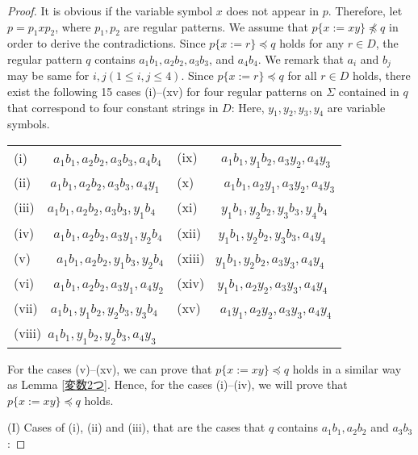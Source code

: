 \begin{proof}
It is obvious if the variable symbol $x$ does not appear in $p$.
Therefore, let $p=p_{1}xp_{2}$, where $p_{1}, p_{2}$ are regular patterns.
We assume that $p \{ x := xy \} \not \preceq q$ in order to derive the contradictions.
Since $p \{ x := r \} \preceq q$ holds for any $r \in D$,
the regular pattern $q$ contains $a_{1}b_{1}, a_{2}b_{2}, a_{3}b_{3}$, and $a_{4}b_{4}$.
We remark that $a_i$ and $b_j$ may be same for $i,j (1\le i,j\le 4)$.
Since $p \{ x := r \} \preceq q$ for all $r \in D$ holds, 
there exist the following 15 cases (i)--(xv) for four regular patterns on $\Sigma$ contained in $q$ that correspond to four constant strings in $D$:
Here, $y_1,y_2,y_3,y_4$ are variable symbols.

\medskip  

\noindent
\begin{tabular}{ll}
(i)~~~~$a_{1}b_{1}, a_{2}b_{2}, a_{3}b_{3}, a_{4}b_{4}$  & (ix)~~~ $a_{1}b_{1}, y_{1}b_{2}, a_{3}y_{2}, a_{4}y_{3}$ \\
(ii)~~~$a_{1}b_{1}, a_{2}b_{2}, a_{3}b_{3}, a_{4}y_{1}$  & (x)~~~~ $a_{1}b_{1}, a_{2}y_{1}, a_{3}y_{2}, a_{4}y_{3}$ \\
(iii)~~$a_{1}b_{1}, a_{2}b_{2}, a_{3}b_{3}, y_{1}b_{4}$ & (xi)~~~ $y_{1}b_{1}, y_{2}b_{2}, y_{3}b_{3}, y_{4}b_{4}$ \\
(iv)~~~$a_{1}b_{1}, a_{2}b_{2}, a_{3}y_{1}, y_{2}b_{4}$  & (xii)~~ $y_{1}b_{1}, y_{2}b_{2}, y_{3}b_{3}, a_{4}y_{4}$ \\
(v)~~~~$a_{1}b_{1}, a_{2}b_{2}, y_{1}b_{3}, y_{2}b_{4}$    & (xiii)~ $y_{1}b_{1}, y_{2}b_{2}, a_{3}y_{3}, a_{4}y_{4}$ \\
(vi)~~~$a_{1}b_{1}, a_{2}b_{2}, a_{3}y_{1}, a_{4}y_{2}$   & (xiv)~~$y_{1}b_{1}, a_{2}y_{2}, a_{3}y_{3}, a_{4}y_{4}$ \\
(vii)~~$a_{1}b_{1}, y_{1}b_{2}, y_{2}b_{3}, y_{3}b_{4}$  & (xv)~~~$a_{1}y_{1}, a_{2}y_{2}, a_{3}y_{3}, a_{4}y_{4}$ \\
(viii)~$a_{1}b_{1}, y_{1}b_{2}, y_{2}b_{3}, a_{4}y_{3}$ &        %
\end{tabular}
\medskip

\noindent
For the cases (v)--(xv), we can prove that $p \{ x := xy \} \preceq q$ holds in a similar way as Lemma \ref{変数2つ}.
Hence, for the cases (i)--(iv), we will prove that $p \{ x := xy \} \preceq q$ holds.

\smallskip
\noindent
(I) Cases of (i), (ii) and (iii), that are the cases that $q$ contains $a_{1}b_{1}, a_{2}b_{2}$ and $a_{3}b_{3}$:


\end{proof}

